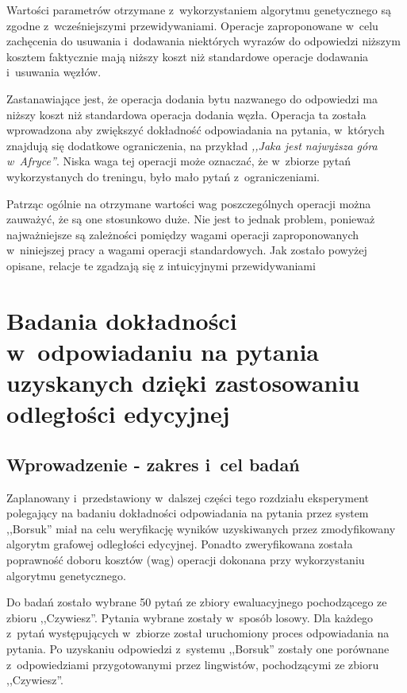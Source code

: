 \documentclass[a4paper, twoside, openright, 12pt]{report}
\begin{document}
        Wartości parametrów otrzymane z~wykorzystaniem algorytmu genetycznego są zgodne z~wcześniejszymi przewidywaniami.
        Operacje zaproponowane w~celu zachęcenia do usuwania i~dodawania niektórych wyrazów do odpowiedzi niższym kosztem
        faktycznie mają niższy koszt niż standardowe operacje dodawania i~usuwania węzłów.

        Zastanawiające jest, że operacja dodania bytu nazwanego do odpowiedzi ma niższy koszt niż standardowa operacja
        dodania węzła. Operacja ta została wprowadzona aby zwiększyć dokładność odpowiadania na pytania, w~których
        znajdują się dodatkowe ograniczenia, na przykład \emph{,,Jaka jest najwyższa góra w~Afryce''}. Niska waga tej
        operacji może oznaczać, że w~zbiorze pytań wykorzystanych do treningu, było mało pytań z~ograniczeniami.

        Patrząc ogólnie na otrzymane wartości wag poszczególnych operacji można zauważyć, że są one stosunkowo duże.
        Nie jest to jednak problem, ponieważ najważniejsze są zależności pomiędzy wagami operacji zaproponowanych
        w~niniejszej pracy a wagami operacji standardowych. Jak zostało powyżej opisane, relacje te zgadzają się z
        intuicyjnymi przewidywaniami

\chapter{Badania dokładności w~odpowiadaniu na pytania uzyskanych dzięki zastosowaniu odległości edycyjnej}
    \section{Wprowadzenie - zakres i~cel badań}
        Zaplanowany i~przedstawiony w~dalszej części tego rozdziału eksperyment polegający na badaniu dokładności
        odpowiadania na pytania przez system ,,Borsuk'' miał na celu weryfikację wyników uzyskiwanych przez zmodyfikowany
        algorytm grafowej odległości edycyjnej. Ponadto zweryfikowana została poprawność doboru kosztów (wag) operacji
        dokonana przy wykorzystaniu algorytmu genetycznego.

        Do badań zostało wybrane 50 pytań ze zbiory ewaluacyjnego pochodzącego ze zbioru ,,Czywiesz''. Pytania wybrane
        zostały w~sposób losowy. Dla każdego z~pytań występujących w~zbiorze został uruchomiony proces odpowiadania
        na pytania. Po uzyskaniu odpowiedzi z~systemu ,,Borsuk'' zostały one porównane z~odpowiedziami przygotowanymi
        przez lingwistów, pochodzącymi ze zbioru ,,Czywiesz''.
\end{document}

